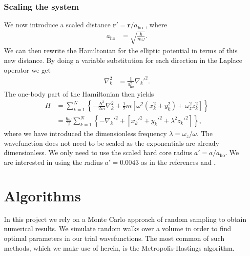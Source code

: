 \documentclass[
    a4paper, aps, twocolumn, floatfix, superscriptaddress,
    nofootinbib]{revtex4-1}
\newcommand{\vf}{\mathbf}
\newcommand{\1}{\mathds{1}}
\newcommand{\brak}[1]{\left[#1\right]}
\newcommand{\brac}[1]{\left\{#1\right\}}
\newcommand{\half}{\frac{1}{2}}
\begin{document}
        \subsubsection{Scaling the system}
            We now introduce a scaled distance $\vf{r}' = \vf{r}/a_{\text{ho}}$
            \cite{dubois2001bose}, where
            \begin{align}
                a_{\text{ho}}
                &=
                \sqrt{\frac{\hbar}{m\omega}}.
            \end{align}
            We can then rewrite the Hamiltonian for the elliptic potential in terms
            of this new distance. By doing a variable substitution for each
            direction in the Laplace operator we get
            \begin{align}
                \nabla_k^2
                &=
                \frac{1}{a_{\text{ho}}^2}{\nabla_k'}^2.
            \end{align}
            The one-body part of the Hamiltonian then yields
            \begin{align}
                H
                &=
                \sum_{k = 1}^N
                \brac{
                    -\frac{\hbar^2}{2m}\nabla_k^2
                    + \half m\brak{
                        \omega^2(x_k^2 + y_k^2)
                        + \omega_z^2 z_k^2
                    }
                }
                \\
                &=
                \frac{\hbar\omega}{2}
                \sum_{k = 1}^N
                \brac{
                    -{\nabla_k'}^2
                    +
                    \brak{
                        {x_k'}^2 + {y_k'}^2 + \lambda^2{z_k'}^2
                    }
                },
                \label{eq:scaled_hamiltonian}
            \end{align}
            where we have introduced the dimensionless frequency $\lambda =
            \omega_z/\omega$. The wavefunction does not need to be scaled as the
            exponentials are already dimensionless. We only need to use the
            scaled hard core radius $a' = a/a_{\text{ho}}$. We are interested in
            using the radius $a' = 0.0043$ as in the references
            \cite{dubois2001bose} and \cite{nilsen2005vortices}.


\section{Algorithms}
    In this project we rely on a Monte Carlo approach of random sampling to
    obtain numerical results.  We simulate random walks over a volume in order
    to find optimal parameters in our trial wavefunctions.  The most common of
    such methods, which we make use of herein, is the Metropolis-Hastings
    algorithm.
\end{document}
